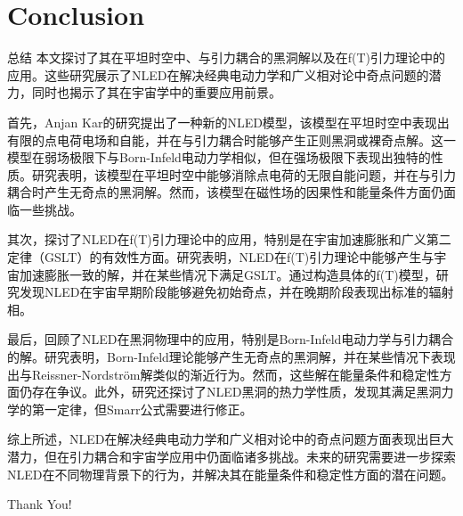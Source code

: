 \documentclass[9pt, dvipsnames]{beamer} %
\begin{document}
\section{Conclusion}
\begin{frame}{总结}
    本文探讨了其在平坦时空中、与引力耦合的黑洞解以及在f(T)引力理论中的应用。这些研究展示了NLED在解决经典电动力学和广义相对论中奇点问题的潜力，同时也揭示了其在宇宙学中的重要应用前景。

首先，Anjan Kar的研究提出了一种新的NLED模型，该模型在平坦时空中表现出有限的点电荷电场和自能，并在与引力耦合时能够产生正则黑洞或裸奇点解。这一模型在弱场极限下与Born-Infeld电动力学相似，但在强场极限下表现出独特的性质。研究表明，该模型在平坦时空中能够消除点电荷的无限自能问题，并在与引力耦合时产生无奇点的黑洞解。然而，该模型在磁性场的因果性和能量条件方面仍面临一些挑战。

其次，探讨了NLED在f(T)引力理论中的应用，特别是在宇宙加速膨胀和广义第二定律（GSLT）的有效性方面。研究表明，NLED在f(T)引力理论中能够产生与宇宙加速膨胀一致的解，并在某些情况下满足GSLT。通过构造具体的f(T)模型，研究发现NLED在宇宙早期阶段能够避免初始奇点，并在晚期阶段表现出标准的辐射相。

最后，回顾了NLED在黑洞物理中的应用，特别是Born-Infeld电动力学与引力耦合的解。研究表明，Born-Infeld理论能够产生无奇点的黑洞解，并在某些情况下表现出与Reissner-Nordström解类似的渐近行为。然而，这些解在能量条件和稳定性方面仍存在争议。此外，研究还探讨了NLED黑洞的热力学性质，发现其满足黑洞力学的第一定律，但Smarr公式需要进行修正。

综上所述，NLED在解决经典电动力学和广义相对论中的奇点问题方面表现出巨大潜力，但在引力耦合和宇宙学应用中仍面临诸多挑战。未来的研究需要进一步探索NLED在不同物理背景下的行为，并解决其在能量条件和稳定性方面的潜在问题。
\end{frame}
    
\begin{frame}[noframenumbering]
    \centering
    {\fontsize{40}{50}\selectfont Thank You!}
\end{frame}
\end{document}
